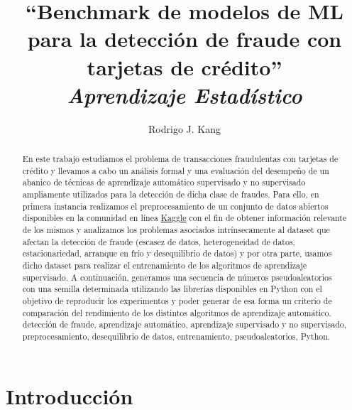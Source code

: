 \documentclass[11pt,a4paper]{article}
\title{\textbf{``Benchmark de modelos de ML para la detecci\'on de fraude con tarjetas de cr\'edito''} \\ \Large \textit{Aprendizaje Estad\'istico}}
\author[1]{Rodrigo J. Kang}
\affil[1]{\normalsize \textit{Facultad de Ciencias Exactas Universidad Nacional de La Plata, C.C 67, 1900 La Plata, Argentina.}}
\date{}
\begin{document}

\maketitle

\begin{abstract}
En este trabajo estudiamos el problema de transacciones fraudulentas con tarjetas de cr\'edito y llevamos a cabo un an\'alisis formal y una evaluaci\'on del desempe\~no de un abanico de t\'ecnicas de aprendizaje autom\'atico supervisado y no supervisado ampliamente utilizados para la detecci\'on de dicha clase de fraudes. Para ello, en primera instancia realizamos el preprocesamiento de un conjunto de datos abiertos disponibles en la comunidad en l\'inea \href{https://www.kaggle.com/datasets/mlg-ulb/creditcardfraud?select=creditcard.csv}{Kaggle} con el fin de obtener informaci\'on relevante de los mismos y analizamos los problemas asociados intr\'insecamente al dataset que afectan la detecci\'on de fraude \cite{carta2019fraud, japkowicz2000learning, dal2015calibrating} (escasez de datos, heterogeneidad de datos, estacionariedad, arranque en fr\'io y desequilibrio de datos) y por otra parte, usamos dicho dataset para realizar el entrenamiento de los algoritmos de aprendizaje supervisado. A continuaci\'on, generamos una secuencia de n\'umeros pseudoaleatorios con una semilla determinada utilizando las librer\'ias disponibles en Python con el objetivo de reproducir los experimentos y poder generar de esa forma un criterio de comparaci\'on del rendimiento de los distintos algoritmos de aprendizaje autom\'atico.\\

{ detecci\'on de fraude, aprendizaje autom\'atico, aprendizaje supervisado y no supervisado, preprocesamiento, desequilibrio de datos, entrenamiento, pseudoaleatorios, Python.}
\end{abstract}




\section{Introducci\'on}
\end{document}

